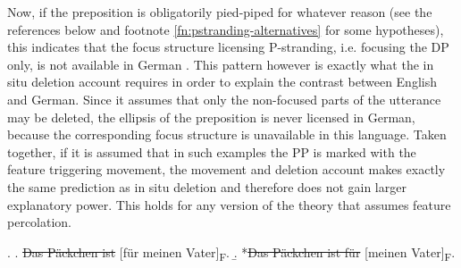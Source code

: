 Now, if the preposition is obligatorily pied-piped for whatever reason (see the references below and footnote \ref{fn:pstranding-alternatives} for some hypotheses), this indicates that the focus structure licensing P-stranding, i.e. focusing the DP only, is not available in German \Next. This pattern however is exactly what the in situ deletion account requires in order to explain the contrast between English and German. Since it assumes that only the non-focused parts of the utterance may be deleted, the ellipsis of the preposition is never licensed in German, because the corresponding focus structure \Next[b] is unavailable in this language. Taken together, if it is assumed that in such examples the PP is marked with the feature triggering movement, the movement and deletion account makes exactly the same prediction as in situ deletion and therefore does not gain larger explanatory power. This holds for any version of the theory that assumes feature percolation.

\ex. \label{ex:pst-focus-german}
\a. \sout{Das Päckchen ist} [für meinen Vater]\textsubscript{F}. 
\b. *\sout{Das Päckchen ist für} [meinen Vater]\textsubscript{F}.

